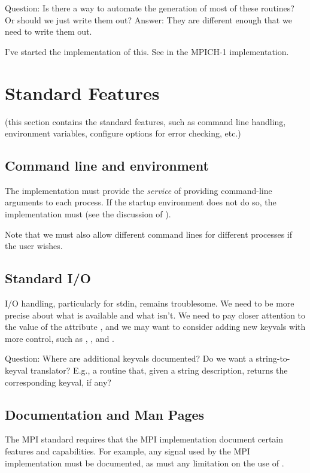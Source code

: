 \documentclass{article}
\begin{document}
Question: Is there a way to automate the generation of most of these routines?
Or should we just write them out?  Answer: They are different enough that we
need to write them out.

I've started the implementation of this.  See  in the
MPICH-1 implementation.

\section{Standard Features}
\label{sec:standard-features}
(this section contains the standard features, such as command line
handling, environment variables, configure options for error checking,
etc.)

\subsection{Command line and environment}
The implementation must provide the \emph{service} of providing
command-line arguments to each process.  If the startup environment
does not do so, the implementation must (see the discussion of
).  

Note that we must also allow different command lines for different processes
if the user wishes.

\subsection{Standard I/O}
I/O handling, particularly for stdin, remains troublesome.  We need to
be more precise about what is available and what isn't.  We need to
pay closer attention to the value of the attribute ,
and we may want to consider adding new keyvals with more control, such
as , , and
. 

Question:  Where are additional keyvals documented?  Do we want a
string-to-keyval translator?  E.g., a routine that, given a string
description, returns the corresponding keyval, if any?

\subsection{Documentation and Man Pages}
The MPI standard requires that the MPI implementation document certain
features and capabilities.  For example, any signal used by the MPI
implementation must be documented, as must any limitation on the use of
.  
\end{document}
